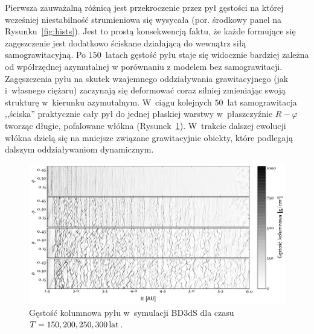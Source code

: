 %
Pierwsza zauważalną różnicą jest przekroczenie przez pył gęstości na której
wcześniej niestabilność strumieniowa się wysycała (por. środkowy panel na
Rysunku~\ref{fig:hists}). Jest to prostą konsekwencją faktu, że każde formujące
się zagęszczenie jest dodatkowo ściskane działającą do wewnątrz siłą
samograwitacyjną. Po $150$~latach gęstość pyłu staje się widocznie bardziej
zależna od wpółrzędnej azymutalnej w porównaniu z modelem bez samograwitacji.
Zagęszczenia pyłu na skutek wzajemnego oddziaływania grawitacyjnego (jak
i~własnego ciężaru) zaczynają się deformować coraz silniej zmieniając swoją
strukturę w~kierunku azymutalnym. W~ciągu kolejnych $50$~lat samograwitacja
,,ściska'' praktycznie cały pył do jednej płaskiej warstwy w~płaszczyźnie $R -
\varphi$ tworząc długie, pofalowane włókna (Rysunek~\ref{fig:projs}). W~trakcie
dalszej ewolucji włókna dzielą się na mniejsze związane grawitacyjnie obiekty,
które podlegają dalszym oddziaływaniom dynamicznym. 
%
\begin{figure}
   \centering
   \includegraphics[width=0.95\linewidth]{figures/proj_sg}
   \caption{Gęstość kolumnowa pyłu w~symulacji BD3dS dla czasu $T=150, 200, 250,
   300\hbox{$\thinspace\textrm{lat}$}$.}
   \label{fig:projs}
\end{figure}
%
